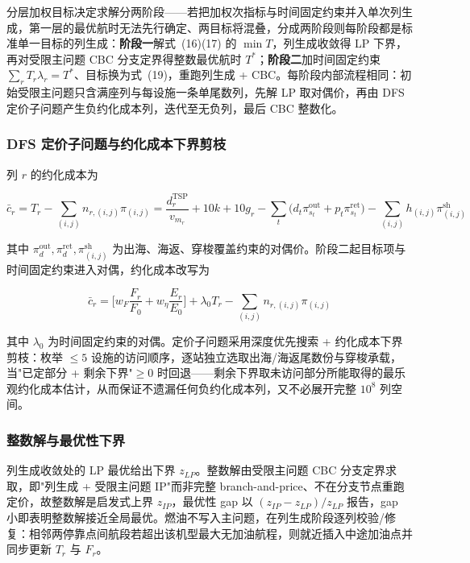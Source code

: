 \documentclass[zihao=-4,a4paper]{ctexart}
\begin{document}
分层加权目标决定求解分两阶段——若把加权次指标与时间固定约束并入单次列生成，第一层的最优航时无法先行确定、两目标将混叠，分成两阶段则每阶段都是标准单一目标的列生成：\textbf{阶段一}解式~(16)(17) 的 $\min T$，列生成收敛得 LP 下界，再对受限主问题 CBC 分支定界得整数最优航时 $T^*$；\textbf{阶段二}加时间固定约束 $\sum_r T_r\lambda_r=T^*$、目标换为式~(19)，重跑列生成 + CBC。每阶段内部流程相同：初始受限主问题只含满座列与每设施一条单尾数列，先解 LP 取对偶价，再由 DFS 定价子问题产生负约化成本列，迭代至无负列，最后 CBC 整数化。

\subsubsection{DFS 定价子问题与约化成本下界剪枝}

列 $r$ 的约化成本为

\begin{equation}
  \bar c_r=T_r-\sum_{(i,j)}n_{r,(i,j)}\pi_{(i,j)}
  =\frac{d_r^{\text{TSP}}}{v_{m_r}}+10k+10g_r-\sum_{t}\big(d_t\pi^{\text{out}}_{s_t}+p_t\pi^{\text{ret}}_{s_t}\big)-\sum_{(i,j)}h_{(i,j)}\pi^{\text{sh}}_{(i,j)}
\end{equation}

其中 $\pi^{\text{out}}_d,\pi^{\text{ret}}_d,\pi^{\text{sh}}_{(i,j)}$ 为出海、海返、穿梭覆盖约束的对偶价。阶段二起目标项与时间固定约束进入对偶，约化成本改写为

\begin{equation}
  \bar c_r=\Big[w_F\frac{F_r}{F_0}+w_\eta\frac{E_r}{E_0}\Big]+\lambda_0 T_r-\sum_{(i,j)}n_{r,(i,j)}\pi_{(i,j)}
\end{equation}

其中 $\lambda_0$ 为时间固定约束的对偶。定价子问题采用深度优先搜索 + 约化成本下界剪枝：枚举 $\le5$ 设施的访问顺序，逐站独立选取出海/海返尾数份与穿梭承载，当"已定部分 + 剩余下界"$\ge0$ 时回退——剩余下界取未访问部分所能取得的最乐观约化成本估计，从而保证不遗漏任何负约化成本列，又不必展开完整 $10^8$ 列空间。

\subsubsection{整数解与最优性下界}

列生成收敛处的 LP 最优给出下界 $z_{LP}$。整数解由受限主问题 CBC 分支定界求取，即"列生成 + 受限主问题 IP"而非完整 branch-and-price、不在分支节点重跑定价，故整数解是启发式上界 $z_{IP}$，最优性 gap 以 $(z_{IP}-z_{LP})/z_{LP}$ 报告，gap 小即表明整数解接近全局最优。燃油不写入主问题，在列生成阶段逐列校验/修复：相邻两停靠点间航段若超出该机型最大无加油航程，则就近插入中途加油点并同步更新 $T_r$ 与 $F_r$。
\end{document}
